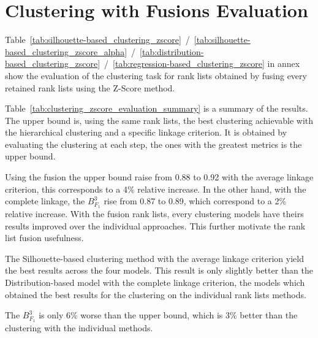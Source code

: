 \section{Clustering with Fusions Evaluation}

Table~\ref{tab:silhouette-based_clustering_zscore}~/~\ref{tab:silhouette-based_clustering_zscore_alpha}~/~\ref{tab:distribution-based_clustering_zscore}~/~\ref{tab:regression-based_clustering_zscore} in annex show the evaluation of the clustering task for rank lists obtained by fusing every retained rank lists using the Z-Score method.

Table~\ref{tab:clustering_zscore_evaluation_summary} is a summary of the results.
The upper bound is, using the same rank lists, the best clustering achievable with the hierarchical clustering and a specific linkage criterion.
It is obtained by evaluating the clustering at each step, the ones with the greatest metrics is the upper bound.

Using the fusion the upper bound raise from 0.88 to 0.92 with the average linkage criterion, this corresponds to a 4\% relative increase.
In the other hand, with the complete linkage, the $B^{3}_{F_1}$ rise from 0.87 to 0.89, which correspond to a 2\% relative increase.
With the fusion rank lists, every clustering models have theirs results improved over the individual approaches.
This further motivate the rank list fusion usefulness.

The Silhouette-based clustering method with the average linkage criterion yield the best results across the four models.
This result is only slightly better than the Distribution-based model with the complete linkage criterion, the models which obtained the best results for the clustering on the individual rank lists methods.

The $B^{3}_{F_1}$ is only 6\% worse than the upper bound, which is 3\% better than the clustering with the individual methods.

\begin{table}[t]
  \centering
  \caption{Retained rank lists Mean $B^{3}_{F_1}$/$r_{diff}$ for each corpus pair}
  \label{tab:clustering_zscore_evaluation_summary}
\end{table}
